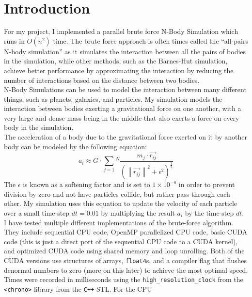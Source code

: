 \section{Introduction}
For my project, I implemented a parallel brute force N-Body Simulation which runs in $O(n^2)$ time.
The brute force approach is often times called the ``all-pairs N-body simulation'' as it simulates
the interaction between all the pairs of bodies in the simulation, while other methods,
such as the Barnes-Hut simulation, achieve better performance by approximating the interaction
by reducing the number of interactions based on the distance between two bodies.\\
\indent N-Body Simulations can be used to model the interaction between many different things, such as
planets, galaxies, and particles. My simulation models the interaction between bodies exerting
a gravitational force on one another, with a very large and dense mass being in the middle that also
exerts a force on every body in the simulation. \\
\indent The acceleration of a body due to the gravitational force exerted on it by another body 
can be modeled by the following equation: 
\begin{equation}
    a_i \approx G \cdot \sum\limits_{j=1}{^N}\frac{m_j \cdot \vec{r_{ij}}}{(\left\lVert\vec{r_{ij}}\right\rVert^2 + \epsilon^2)^\frac{3}{2}} \label{sec:grav}
\end{equation}
The $\epsilon$ is known as a softening factor and is set to $1 \times 10^{-8}$ in order to prevent 
division by zero and not have particles collide, but rather pass through each other.
My simulation uses this equation to update the velocity of each particle over a small time-step $dt = 0.01$
by multiplying the result $a_i$ by the time-step $dt$. \\
\indent I have tested multiple different implementations of the brute-force algorithm. 
They include sequential CPU code, OpenMP parallelized CPU code, basic CUDA code 
(this is just a direct port of the sequential CPU code to a CUDA kernel),
and optimized CUDA code using shared memory and loop unrolling.
Both of the CUDA versions use structures of arrays, \verb|float4|s, and a compiler flag that flushes 
denormal numbers to zero (more on this later) to achieve the most optimal speed. \\
\indent Times were recorded in milliseconds using the \verb|high_resolution_clock| from 
the \verb|<chrono>| library from the \verb|C++| STL. For the CPU 
